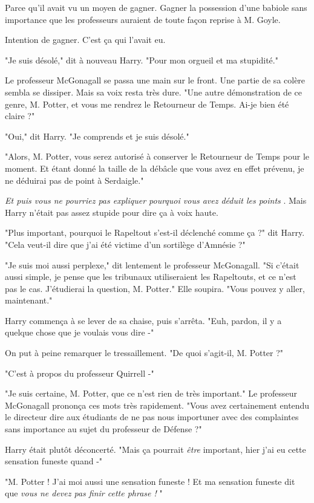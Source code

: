 Parce qu'il avait vu un moyen de gagner. Gagner la possession d'une babiole sans importance que les professeurs auraient de toute façon reprise à M. Goyle.

Intention de gagner. C'est ça qui l'avait eu.

"Je suis désolé," dit à nouveau Harry. "Pour mon orgueil et ma stupidité."

Le professeur McGonagall se passa une main sur le front. Une partie de sa colère sembla se dissiper. Mais sa voix resta très dure. "Une autre démonstration de ce genre, M. Potter, et vous me rendrez le Retourneur de Temps. Ai-je bien été claire ?"

"Oui," dit Harry. "Je comprends et je suis désolé."

"Alors, M. Potter, vous serez autorisé à conserver le Retourneur de Temps pour le moment. Et étant donné la taille de la débâcle que vous avez en effet prévenu, je ne déduirai pas de point à Serdaigle."

\emph{Et puis vous ne pourriez pas expliquer pourquoi vous avez déduit les points} . Mais Harry n'était pas assez stupide pour dire ça à voix haute.

"Plus important, pourquoi le Rapeltout s'est-il déclenché comme ça ?" dit Harry. "Cela veut-il dire que j'ai été victime d'un sortilège d'Amnésie ?"

"Je suis moi aussi perplexe," dit lentement le professeur McGonagall. "Si c'était aussi simple, je pense que les tribunaux utiliseraient les Rapeltouts, et ce n'est pas le cas. J'étudierai la question, M. Potter." Elle soupira. "Vous pouvez y aller, maintenant."

Harry commença à se lever de sa chaise, puis s'arrêta. "Euh, pardon, il y a quelque chose que je voulais vous dire -"

On put à peine remarquer le tressaillement. "De quoi s'agit-il, M. Potter ?"

"C'est à propos du professeur Quirrell -"

"Je suis certaine, M. Potter, que ce n'est rien de très important." Le professeur McGonagall prononça ces mots très rapidement. "Vous avez certainement entendu le directeur dire aux étudiants de ne pas nous importuner avec des complaintes sans importance au sujet du professeur de Défense ?"

Harry était plutôt déconcerté. "Mais ça pourrait \emph{être}  important, hier j'ai eu cette sensation funeste quand -"

"M. Potter ! J'ai moi aussi une sensation funeste ! Et ma sensation funeste dit que \emph{vous ne devez pas finir cette phrase !} "


